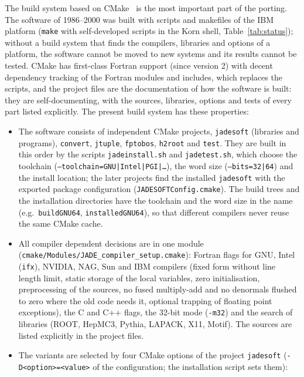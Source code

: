 The build system based on CMake~\cite{CMake:web} is the most important part of the porting.
The software of 1986--2000 was built with scripts and makefiles of the IBM platform (\texttt{make} with
self-developed scripts in the Korn shell, Table~\ref{tab:status}); without a build system that finds the compilers, libraries and options of
a platform, the software cannot be moved to new systems and its results cannot be tested. CMake has first-class
Fortran support (since version 2) with decent dependency tracking of the Fortran modules and includes, which
replaces the scripts, and the project files are the documentation of how the software is built: they are
self-documenting, with the sources, libraries, options and tests of every part listed explicitly. The present build system has these properties:
\begin{itemize}
\item The software consists of independent CMake projects, \texttt{jadesoft} (libraries and programs),
\texttt{convert}, \texttt{jtuple}, \texttt{fptobos}, \texttt{h2root} and \texttt{test}. They are built in this
order by the scripts \texttt{jadeinstall.sh} and \texttt{jadetest.sh}, which choose the toolchain
(\texttt{--toolchain=GNU|Intel|PGI|\dots}), the word size (\texttt{--bits=32|64}) and the install location;
the later projects find the installed \texttt{jadesoft} with the exported package configuration
(\texttt{JADESOFTConfig.cmake}). The build trees and the installation directories have the toolchain and
the word size in the name (e.g.\ \texttt{buildGNU64}, \texttt{installedGNU64}), so that different compilers
never reuse the same CMake cache.
\item All compiler dependent decisions are in one module (\texttt{cmake/\allowbreak{}Modules/\allowbreak{}JADE\_\allowbreak{}compiler\_\allowbreak{}setup.cmake}):
Fortran flags for GNU, Intel (\texttt{ifx}), NVIDIA, NAG, Sun and IBM compilers (fixed form without line length limit,
static storage of the local variables, zero initialisation, preprocessing of the sources, no fused
multiply-add and no denormals flushed to zero where the old code needs it, optional trapping of floating point
exceptions), the C and C++ flags, the 32-bit mode (\texttt{-m32}) and the search of libraries (ROOT, HepMC3, Pythia,
LAPACK, X11, Motif). The sources are listed explicitly in the project files.
\item The variants are selected by four CMake options of the project \texttt{jadesoft} (\texttt{-D<option>=<value>} of the configuration; the installation script sets them):

\end{itemize}
